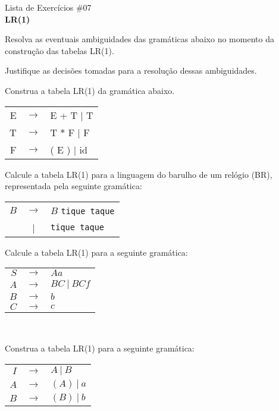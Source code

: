 \documentclass{compiladores}
\begin{document}
\begin{center}
{\LARGE Lista de Exercícios \#07}\\
{\bf LR(1)}
\end{center}

\bigskip

Resolva as eventuais ambiguidades das gramáticas abaixo no momento da
construção das tabelas LR(1).

Justifique as decisões tomadas para a resolução dessas ambiguidades.

\bigskip

\begin{listanumerada}
\item \label{x} Construa a tabela LR(1) da gramática abaixo.
 
    \begin{tabular}{rcl}
     E & $\rightarrow$ & E + T $\vert$ T \\
     T & $\rightarrow$ & T $*$ F $\vert$ F \\
     F & $\rightarrow$ & ( E ) $\vert$ id
     \end{tabular}

\item \label{br} Calcule a tabela LR(1) para a linguagem do barulho de um
  relógio (BR), representada pela seguinte gramática:

     \begin{tabular}{rcl}
     $B$ & $\rightarrow$ & $B$ \texttt{tique taque} \\
     & | & \texttt{tique taque} \\
     \end{tabular} 

\item \label{g1} Calcule a tabela LR(1) para a seguinte gramática:

  \begin{tabular}{rcl}
    $S$ & $\rightarrow$ & $Aa$ \\
    $A$ & $\rightarrow$ & $BC\ |\ BCf$ \\
    $B$ & $\rightarrow$ & $b$ \\
    $C$ & $\rightarrow$ & $c$ \\
  \end{tabular} \\

\item \label{g2} Construa a tabela LR(1) para a seguinte gramática:

  \begin{tabular}{rcl}
    $I$ & $\rightarrow$ & $A\ |\ B$ \\
    $A$ & $\rightarrow$ & $( A )\ |\ a$ \\
    $B$ & $\rightarrow$ & $( B )\ |\ b$ \\
  \end{tabular} \\


\end{listanumerada}
\end{document}
